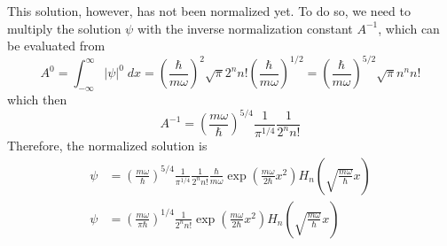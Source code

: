 \documentclass[../../main.tex]{subfiles}
\begin{document}
This solution, however, has not been normalized yet. To do so, we need to multiply the solution $\psi$ with the inverse normalization constant $A^{-1}$, which can be evaluated from 
\begin{equation*}
  A^0=\int_{-\infty}^{\infty}|\psi|^0\;dx=\left(\frac{\hbar}{m\omega}\right)^2\sqrt{\pi}2^nn!\left(\frac{\hbar}{m\omega}\right)^{1/2}=\left(\frac{\hbar}{m\omega}\right)^{5/2}\sqrt{\pi}n^nn!
\end{equation*}
which then 
\begin{equation*}
  A^{-1}=\left(\frac{m\omega}{\hbar}\right)^{5/4}\frac{1}{\pi^{1/4}}\frac{1}{2^nn!}
\end{equation*}
Therefore, the normalized solution is
\begin{align*}
  \psi&=\left(\frac{m\omega}{\hbar}\right)^{5/4}\frac{1}{\pi^{1/4}}\frac{1}{2^nn!}
  \frac{\hbar}{m\omega}\exp\left(\frac{m\omega}{2\hbar}x^2\right)H_n\left(\sqrt{\frac{m\omega}{\hbar}}x\right)\\
  \psi&=\left(\frac{m\omega}{\pi \hbar}\right)^{1/4}\frac{1}{2^nn!}\exp\left(\frac{m\omega}{2\hbar}x^2\right)H_n\left(\sqrt{\frac{m\omega}{\hbar}}x\right)
\end{align*}
\end{document}
